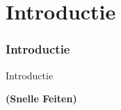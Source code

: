 %

\section{Introductie}
\begin{frame}[fragile]
	\frametitle{Introductie}

	\begin{center}\huge{Introductie}\end{center}
	\begin{center}\huge{\color{typo3darkgrey}\textbf{(Snelle Feiten)}}\end{center}

\end{frame}


